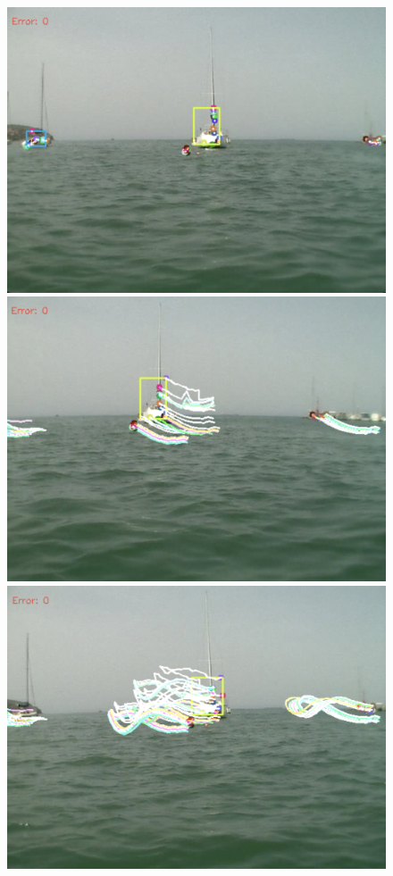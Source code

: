\documentclass[10pt,twocolumn,letterpaper]{article}
\begin{document}
\begin{figure}
   \centering
   \includegraphics[width=\linewidth]{images/forgetting1.png}
   \includegraphics[width=\linewidth]{images/forgetting2.png}
   \includegraphics[width=\linewidth]{images/forgetting3.png}

\end{figure}
\end{document}

